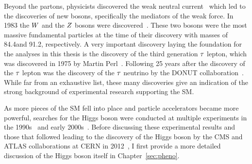 Beyond the partons, physicists discovered the weak neutral current~\cite{HASERT1973121,HASERT1973138} which 
led to the discoveries of new bosons, specifically the mediators
of the weak force.
In 1983 the $W$ and the $Z$ bosons were discovered~\cite{AUBERT1983275,1983398}. 
These two bosons were the
most massive fundamental particles at the time of their discovery with masses of
84.4\GeV and 91.2\GeV, respectively.
A very important discovery laying the foundation for the analyses in this thesis is
the discovery of the third generation $\tau$ lepton, which was discovered
in 1975 by Martin Perl~\cite{PhysRevLett.35.1489}. Following 25 years after the discovery of the
$\tau$ lepton was the discovery of the $\tau$ neutrino by
the DONUT collaboration~\cite{Kodama:2000mp}. While far from an exhaustive list,
these many discoveries give an indication of the strong background of experimental
research supporting the SM.

As more pieces of the SM fell into place and particle accelerators became more powerful,
searches for the Higgs boson were conducted at multiple experiments in the 
1990s~\cite{Barate:2000ts,Abdallah:2003ip,Achard:2001pj,Abbiendi:2000ac} and early
2000s~\cite{Aaltonen:2012jh, Abazov:2012zj}. 
Before discussing these experimental results and those that followed leading to the
discovery of the Higgs boson by the CMS and ATLAS collaborations at 
CERN in 2012~\cite{Aad:2012tfa, Chatrchyan:2012xdj, Chatrchyan:2013lba}, 
I first provide a more detailed discussion
of the Higgs boson itself in Chapter~\ref{sec:pheno}.


